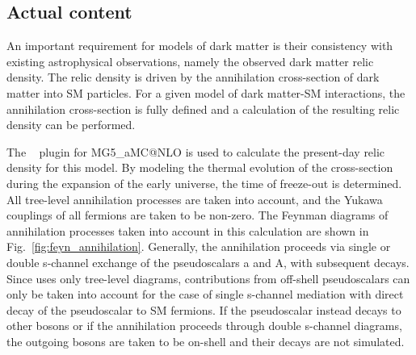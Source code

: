 \newcommand{\mgamcnlo}{MG5\_aMC@NLO\xspace}
\newcommand{\A}{A}

\subsection{Actual content}

An important requirement for models of dark matter is their consistency with existing astrophysical observations, namely the observed dark matter relic density.
The relic density is driven by the annihilation cross-section of dark matter into SM particles.
For a given model of dark matter-SM interactions, the annihilation cross-section is fully defined and a calculation of the resulting relic density can be performed. 

The \maddm~\cite{Backovic:2013dpa,Backovic:2015cra} plugin for \mgamcnlo is used to calculate the present-day relic density for this model.
By modeling the thermal evolution of the cross-section during the expansion of the early universe, the time of freeze-out is determined.
All tree-level annihilation processes are taken into account, and the Yukawa couplings of all fermions are taken to be non-zero.
The Feynman diagrams of annihilation processes taken into account in this calculation are shown in Fig.~\ref{fig:feyn_annihilation}. Generally, the annihilation proceeds via single or double s-channel exchange of the pseudoscalars a and A, with subsequent decays. Since \maddm uses only tree-level diagrams, contributions from off-shell pseudoscalars can only be taken into account for the case of single s-channel mediation with direct decay of the pseudoscalar to SM fermions. If the pseudoscalar instead decays to other bosons or if the annihilation proceeds through double s-channel diagrams, the outgoing bosons are taken to be on-shell and their decays are not simulated. 

